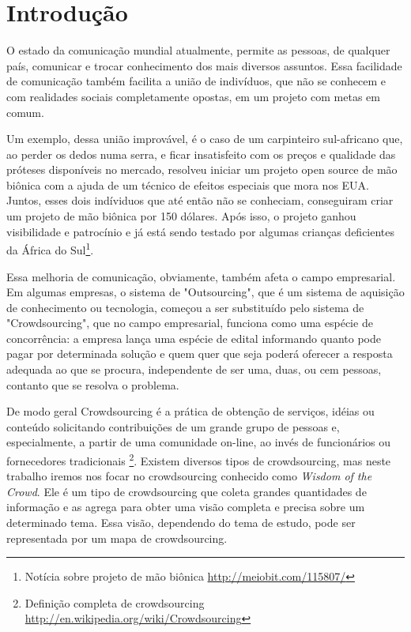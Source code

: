 \chapter{Introdução}

O estado  da comunicação mundial atualmente, permite as pessoas, de qualquer país, comunicar e trocar conhecimento dos mais diversos assuntos. Essa facilidade de comunicação também facilita a união de indivíduos, que não se conhecem e com realidades sociais completamente opostas, em um projeto com metas em comum.

Um exemplo, dessa união improvável, é o caso de um carpinteiro sul-africano que, ao perder os dedos numa serra, e ficar insatisfeito com os preços e qualidade das próteses disponíveis no mercado, resolveu iniciar um projeto open source de mão biônica com a ajuda de um técnico de efeitos especiais que mora nos EUA. Juntos, esses dois indíviduos que até então não se conheciam, conseguiram criar um projeto de mão biônica por 150 dólares. Após isso, o projeto ganhou visibilidade e patrocínio e já está sendo testado por algumas crianças deficientes da África do Sul\footnote{\label{maobionica} Notícia sobre projeto de mão biônica \url{http://meiobit.com/115807/}}.

Essa melhoria de comunicação, obviamente, também  afeta o campo empresarial. Em algumas empresas, o sistema de "Outsourcing", que é um sistema de aquisição de conhecimento ou tecnologia, começou a ser substituído pelo sistema de "Crowdsourcing", que no campo empresarial, funciona como uma espécie de concorrência: a empresa lança uma espécie de edital informando quanto pode pagar por determinada solução e quem quer que seja poderá oferecer a resposta adequada ao que se procura, independente de ser uma, duas, ou cem pessoas, contanto que se resolva o problema.

De modo geral Crowdsourcing é a prática de obtenção de serviços, idéias ou conteúdo solicitando contribuições de um grande grupo de pessoas e, especialmente, a partir de uma comunidade on-line, ao invés de funcionários ou fornecedores tradicionais \footnote{\label{wiki-crowd} Definição completa de crowdsourcing \url{ http://en.wikipedia.org/wiki/Crowdsourcing}}.
Existem diversos tipos de crowdsourcing, mas neste trabalho iremos nos focar no crowdsourcing conhecido como \emph{Wisdom of the Crowd}. Ele é um tipo de crowdsourcing que coleta grandes quantidades de informação e as agrega para obter uma visão completa e precisa sobre um determinado tema. Essa visão, dependendo do tema de estudo, pode ser representada por um mapa de crowdsourcing.

